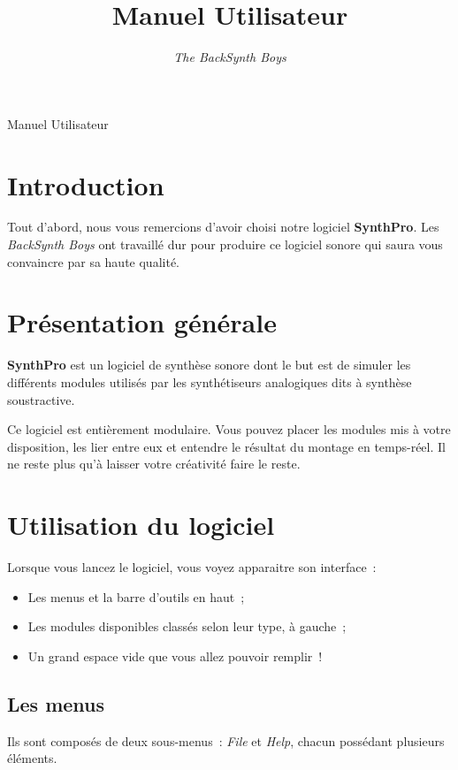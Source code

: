 \documentclass[a4paper,oneside,frenchb,10pt]{article}
\title{Manuel Utilisateur}
\author{\emph{The BackSynth Boys}}
\begin{document}
\thispagestyle{empty}

\begin{center}
\huge Manuel Utilisateur
\end{center}

\vspace{1cm}

\tableofcontents

\section{Introduction}

Tout d'abord, nous vous remercions d'avoir choisi notre logiciel
\textbf{SynthPro}. Les \emph{BackSynth Boys} ont travaillé dur pour produire ce logiciel
sonore qui saura vous convaincre par sa haute qualité.

\section{Présentation générale}

\textbf{SynthPro} est un logiciel de synthèse sonore dont le but est de 
simuler les différents modules utilisés par les synthétiseurs analogiques
dits à synthèse soustractive.

Ce logiciel est entièrement modulaire. Vous pouvez placer les modules
mis à votre disposition, les lier entre eux et entendre le résultat du
montage en temps-réel. Il ne reste plus qu'à laisser votre créativité
faire le reste.

\section{Utilisation du logiciel}

Lorsque vous lancez le logiciel, vous voyez apparaitre son interface~:

\begin{itemize}
\item
  Les menus et la barre d'outils en haut~;
\item
  Les modules disponibles classés selon leur type, à gauche~;
\item
  Un grand espace vide que vous allez pouvoir remplir~!
\end{itemize}
\subsection{Les menus}

Ils sont composés de deux sous-menus~: \emph{File} et \emph{Help}, chacun 
possédant plusieurs éléments.
\end{document}
